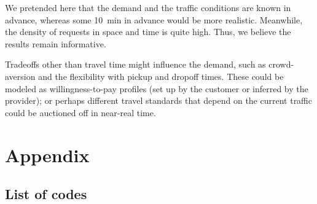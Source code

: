 \documentclass[12pt,notitlepage]{article}
\begin{document}
%

We pretended here that the demand
and the traffic conditions
are known in advance,
whereas some \SI{10}{min} in advance
would be more realistic.
%
Meanwhile, the density of requests in space and time is quite high.
%
Thus, we believe the results remain informative.

%

Tradeoffs other than travel time 
might influence the demand,
such as crowd-aversion
and 
the flexibility with pickup and dropoff times.
%
%
These could be modeled as willingness-to-pay profiles
(set up by the customer or inferred by the provider);
or perhaps 
different travel standards 
that depend on the current traffic
could be auctioned off in near-real time.

%





\clearpage
\renewcommand*{\bibfont}{\normalfont\small}
\printbibliography %




\section{Appendix}

\subsection{List of codes} \label{s:code}

\begin{center}
\SHOWCODES
\end{center}




\SHOWTODOS



\leavevmode\vfill{\tiny\color{lightgray}\hfill{\DTMnow}}
\end{document}
